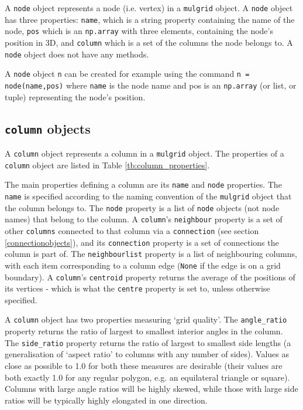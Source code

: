 A \texttt{node} object represents a node (i.e. vertex) in a \texttt{mulgrid} object.  A \texttt{node} object has three properties: \texttt{name}, which is a string property containing the name of the node, \texttt{pos} which is an \texttt{np.array} with three elements, containing the node's position in 3D, and \texttt{column} which is a set of the columns the node belongs to.  A \texttt{node} object does not have any methods.

A \texttt{node} object \texttt{n} can be created for example using the command \texttt{n = node(name,pos)} where \texttt{name} is the node name and pos is an \texttt{np.array} (or list, or tuple) representing the node's position.

\subsection{\texttt{column} objects}
\label{columnobjects}

A \texttt{column} object represents a column in a \texttt{mulgrid} object.  The properties of a \texttt{column} object are listed in Table \ref{tb:column_properties}.

The main properties defining a column are its \texttt{name} and \texttt{node} properties.  The \texttt{name} is specified according to the naming convention of the \texttt{mulgrid} object that the column belongs to.  The \texttt{node} property is a list of \texttt{node} objects (not node names) that belong to the column.  A \texttt{column}'s \texttt{neighbour} property is a set of other \texttt{columns} connected to that column via a \texttt{connection} (see section \ref{connectionobjects}), and its \texttt{connection} property is a set of connections the column is part of.  The \texttt{neighbourlist} property is a list of neighbouring columns, with each item corresponding to a column edge (\texttt{None} if the edge is on a grid boundary).  A \texttt{column}'s \texttt{centroid} property returns the average of the positions of its vertices - which is what the \texttt{centre} property is set to, unless otherwise specified.

A \texttt{column} object has two properties measuring `grid quality'.  The \texttt{angle\_ratio} property returns the ratio of largest to smallest interior angles in the column.  The \texttt{side\_ratio} property returns the ratio of largest to smallest side lengths (a generalisation of `aspect ratio' to columns with any number of sides).  Values as close as possible to 1.0 for both these measures are desirable (their values are both exactly 1.0 for any regular polygon, e.g. an equilateral triangle or square).  Columns with large angle ratios will be highly skewed, while those with large side ratios will be typically highly elongated in one direction.

